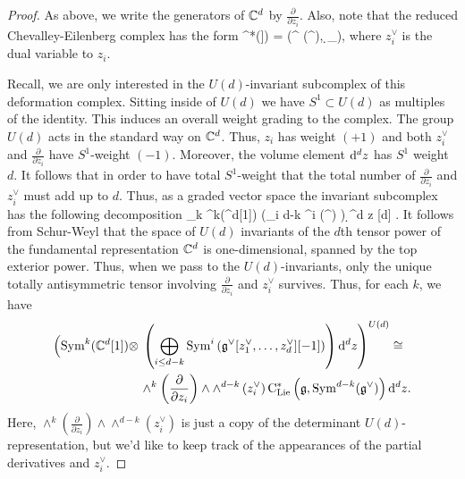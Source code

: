 \begin{proof}

As above, we write the generators of $\mathbb C^d$ by $\frac{\partial}{\partial z_i}$. 
Also, note that the reduced Chevalley-Eilenberg complex has the form
\beqn
\cred^*(\fg[[z_1,\ldots,z_n]]) = \left(\Sym^{} \left(\fg^ \right), \d_{\fg}\right),
\eeqn
where $z_i^\vee$ is the dual variable to $z_i$. 

Recall, we are only interested in the $U(d)$-invariant subcomplex of this deformation complex. 
Sitting inside of $U(d)$ we have $S^1 \subset U(d)$ as multiples of the identity. 
This induces an overall weight grading to the complex.
The group $U(d)$ acts in the standard way on $\mathbb C^d$.
Thus, $z_i$ has weight $(+1)$ and both $z_i^\vee$ and $\frac{\partial}{\partial z_i}$ have $S^1$-weight $(-1)$. 
Moreover, the volume element ${\rm d}^d z$ has $S^1$ weight $d$.
It follows that in order to have total $S^1$-weight that the total number of $\frac{\partial}{\partial z_i}$ and $z_i^\vee$ must add up to $d$.
Thus, as a graded vector space the invariant subcomplex has the following decomposition
\beqn
\bigoplus_k \Sym^k(\CC^d[1]) \tensor \left(\bigoplus_{i \leq d-k} \Sym^{i} \left(\fg^ \right) \right) \d^d z [d] .
\eeqn
It follows from Schur-Weyl that the space of $U(d)$ invariants of the $d$th tensor power of the fundamental representation $\mathbb C^d$ is one-dimensional, spanned by the top exterior power. 
Thus, when we pass to the $U(d)$-invariants, only the unique totally antisymmetric tensor involving $\frac{\partial}{\partial z_i}$ and $z_i^\vee$ survives. 
Thus, for each $k$, we have
\begin{align}
\label{U(d) invariants}
\left({\rm Sym}^k(\mathbb C^d[1]) \otimes \right. & \left. \left(\bigoplus_{i \leq d-k} {\rm Sym}^{i} \left(\mathfrak g^\vee [z_1^\vee,\ldots,z_d^\vee][-1] \right) \right) {\rm d}^d z\right)^{U(d)} \cong \\ & \wedge^{k}\left(\frac{\partial}{\partial z_i}\right) \wedge \wedge^{d-k}\left(z_i^\vee\right) {\rm C}_{{\rm Lie}}^*\left(\mathfrak g , {\rm Sym}^{d-k}(\mathfrak g^\vee)\right) {\rm d}^d z .
\end{align}
Here, $\wedge^{k}\left(\frac{\partial}{\partial z_i}\right) \wedge \wedge^{d-k}\left(z_i^\vee\right)$ is just a copy of the determinant $U(d)$-representation, but we'd like to keep track of the appearances of the partial derivatives and $z_i^\vee$. 

\end{proof}
